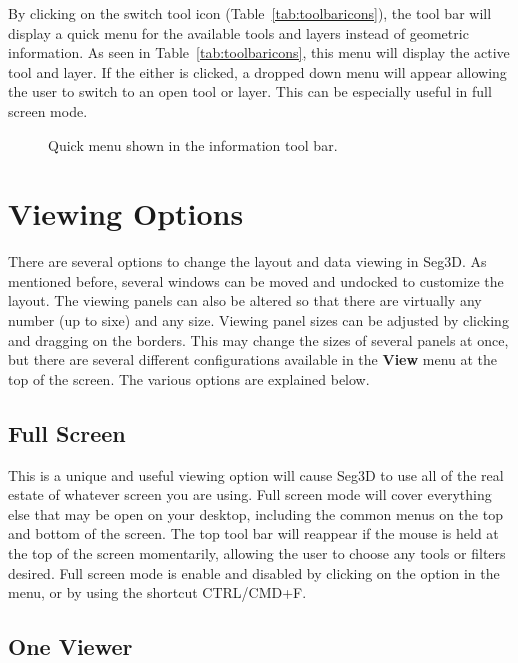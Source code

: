 \documentclass[fleqn,11pt,openany]{book}
\begin{document}
By clicking on the switch tool icon (Table~\ref{tab:toolbaricons}), the tool bar will display a quick menu for the available tools and layers instead of geometric information.
As seen in Table~\ref{tab:toolbaricons}, this menu will display the active tool and layer.
If the either is clicked, a dropped down menu will appear allowing the user to switch to an open tool or layer.
This can be especially useful in full screen mode.  

\begin{figure}[h!]
\caption{Quick menu shown in the information tool bar.}\label{fig:quickmenu}
\end{figure}


\section{Viewing Options}
\label{sec:viewing}

There are several options to change the layout and data viewing in Seg3D.
As mentioned before, several windows can be moved and undocked to customize the layout.
The viewing panels can also be altered so that there are virtually any number (up to sixe) and any size.
Viewing panel sizes can be adjusted by clicking and dragging on the borders.
This may change the sizes of several panels at once, but there are several different configurations available in the \textbf{View} menu at the top of the screen.
The various options are explained below.

\subsection{Full Screen}

This is a unique and useful viewing option will cause Seg3D to use all of the real estate of whatever screen you are using.  Full screen mode will cover everything else that may be open on your desktop, including the common menus on the top and bottom of the screen.  The top tool bar will reappear if the mouse is held at the top of the screen momentarily, allowing the user to choose any tools or filters desired.  Full screen mode is enable and disabled by clicking on the option in the menu, or by using the shortcut CTRL/CMD+F.  

\subsection{One Viewer}
\end{document}
